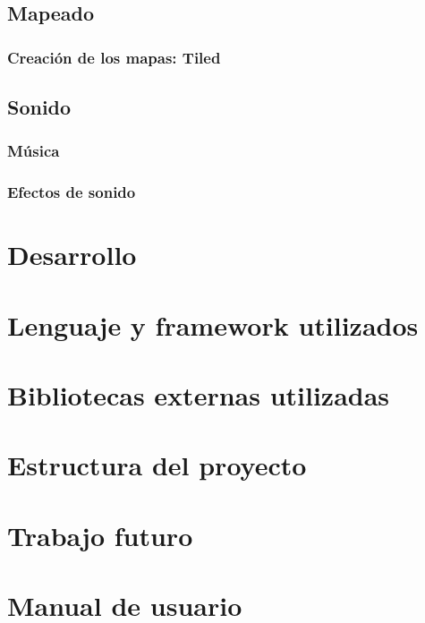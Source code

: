 \documentclass[12pt, spanish]{article}
\begin{document}
\subsection{Mapeado}

\subsubsection{Creación de los mapas: Tiled}

\subsection{Sonido}

\subsubsection{Música}

\subsubsection{Efectos de sonido}

\section*{Desarrollo}
\label{sec:desarrollo}

\section{Lenguaje y framework utilizados}

\section{Bibliotecas externas utilizadas}

\section{Estructura del proyecto}


\section*{Trabajo futuro}
\label{sec:futuro}


\section*{Manual de usuario}
\label{sec:manual}
\end{document}
